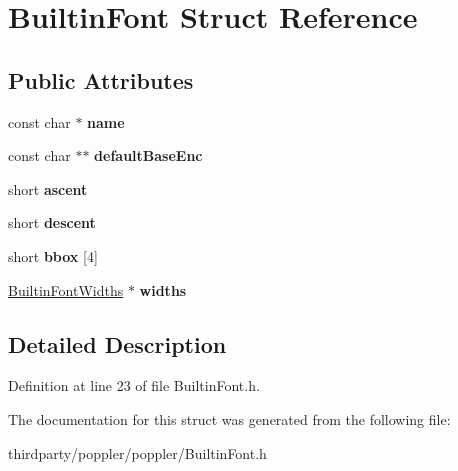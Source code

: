 \hypertarget{struct_builtin_font}{}\section{Builtin\+Font Struct Reference}
\label{struct_builtin_font}
\subsection*{Public Attributes}
\begin{DoxyCompactItemize}
\item 
\mbox{\label{struct_builtin_font_a154eefa3304957a965deda58ac79d817}} 
const char $\ast$ {\bfseries name}
\item 
\mbox{\label{struct_builtin_font_a582f17d576f693ae516f290db7ff8ca4}} 
const char $\ast$$\ast$ {\bfseries default\+Base\+Enc}
\item 
\mbox{\label{struct_builtin_font_a1cbfeddbf77435123ee5499163a2dbb3}} 
short {\bfseries ascent}
\item 
\mbox{\label{struct_builtin_font_a352f14359ecd7e135c28dfaad8065f25}} 
short {\bfseries descent}
\item 
\mbox{\label{struct_builtin_font_a2380758fe64529e7aec21840b2e245e5}} 
short {\bfseries bbox} \mbox{[}4\mbox{]}
\item 
\mbox{\label{struct_builtin_font_a98bb939fffe584505a43e09901566916}} 
\hyperlink{class_builtin_font_widths}{Builtin\+Font\+Widths} $\ast$ {\bfseries widths}
\end{DoxyCompactItemize}


\subsection{Detailed Description}


Definition at line 23 of file Builtin\+Font.\+h.



The documentation for this struct was generated from the following file\+:\begin{DoxyCompactItemize}
\item 
thirdparty/poppler/poppler/Builtin\+Font.\+h\end{DoxyCompactItemize}
